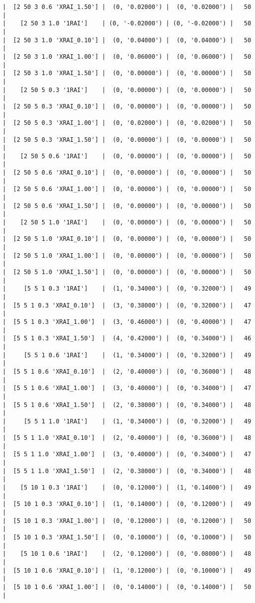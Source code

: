 \documentclass{article}
\begin{document}
\begin{verbatim}
|  [2 50 3 0.6 'XRAI_1.50'] |  (0, '0.02000') |  (0, '0.02000') |   50  |
|    [2 50 3 1.0 '1RAI']    | (0, '-0.02000') | (0, '-0.02000') |   50  |
|  [2 50 3 1.0 'XRAI_0.10'] |  (0, '0.04000') |  (0, '0.04000') |   50  |
|  [2 50 3 1.0 'XRAI_1.00'] |  (0, '0.06000') |  (0, '0.06000') |   50  |
|  [2 50 3 1.0 'XRAI_1.50'] |  (0, '0.00000') |  (0, '0.00000') |   50  |
|    [2 50 5 0.3 '1RAI']    |  (0, '0.00000') |  (0, '0.00000') |   50  |
|  [2 50 5 0.3 'XRAI_0.10'] |  (0, '0.00000') |  (0, '0.00000') |   50  |
|  [2 50 5 0.3 'XRAI_1.00'] |  (0, '0.02000') |  (0, '0.02000') |   50  |
|  [2 50 5 0.3 'XRAI_1.50'] |  (0, '0.00000') |  (0, '0.00000') |   50  |
|    [2 50 5 0.6 '1RAI']    |  (0, '0.00000') |  (0, '0.00000') |   50  |
|  [2 50 5 0.6 'XRAI_0.10'] |  (0, '0.00000') |  (0, '0.00000') |   50  |
|  [2 50 5 0.6 'XRAI_1.00'] |  (0, '0.00000') |  (0, '0.00000') |   50  |
|  [2 50 5 0.6 'XRAI_1.50'] |  (0, '0.00000') |  (0, '0.00000') |   50  |
|    [2 50 5 1.0 '1RAI']    |  (0, '0.00000') |  (0, '0.00000') |   50  |
|  [2 50 5 1.0 'XRAI_0.10'] |  (0, '0.00000') |  (0, '0.00000') |   50  |
|  [2 50 5 1.0 'XRAI_1.00'] |  (0, '0.00000') |  (0, '0.00000') |   50  |
|  [2 50 5 1.0 'XRAI_1.50'] |  (0, '0.00000') |  (0, '0.00000') |   50  |
|     [5 5 1 0.3 '1RAI']    |  (1, '0.34000') |  (0, '0.32000') |   49  |
|  [5 5 1 0.3 'XRAI_0.10']  |  (3, '0.38000') |  (0, '0.32000') |   47  |
|  [5 5 1 0.3 'XRAI_1.00']  |  (3, '0.46000') |  (0, '0.40000') |   47  |
|  [5 5 1 0.3 'XRAI_1.50']  |  (4, '0.42000') |  (0, '0.34000') |   46  |
|     [5 5 1 0.6 '1RAI']    |  (1, '0.34000') |  (0, '0.32000') |   49  |
|  [5 5 1 0.6 'XRAI_0.10']  |  (2, '0.40000') |  (0, '0.36000') |   48  |
|  [5 5 1 0.6 'XRAI_1.00']  |  (3, '0.40000') |  (0, '0.34000') |   47  |
|  [5 5 1 0.6 'XRAI_1.50']  |  (2, '0.38000') |  (0, '0.34000') |   48  |
|     [5 5 1 1.0 '1RAI']    |  (1, '0.34000') |  (0, '0.32000') |   49  |
|  [5 5 1 1.0 'XRAI_0.10']  |  (2, '0.40000') |  (0, '0.36000') |   48  |
|  [5 5 1 1.0 'XRAI_1.00']  |  (3, '0.40000') |  (0, '0.34000') |   47  |
|  [5 5 1 1.0 'XRAI_1.50']  |  (2, '0.38000') |  (0, '0.34000') |   48  |
|    [5 10 1 0.3 '1RAI']    |  (0, '0.12000') |  (1, '0.14000') |   49  |
|  [5 10 1 0.3 'XRAI_0.10'] |  (1, '0.14000') |  (0, '0.12000') |   49  |
|  [5 10 1 0.3 'XRAI_1.00'] |  (0, '0.12000') |  (0, '0.12000') |   50  |
|  [5 10 1 0.3 'XRAI_1.50'] |  (0, '0.10000') |  (0, '0.10000') |   50  |
|    [5 10 1 0.6 '1RAI']    |  (2, '0.12000') |  (0, '0.08000') |   48  |
|  [5 10 1 0.6 'XRAI_0.10'] |  (1, '0.12000') |  (0, '0.10000') |   49  |
|  [5 10 1 0.6 'XRAI_1.00'] |  (0, '0.14000') |  (0, '0.14000') |   50  |

\end{verbatim}
\end{document}
